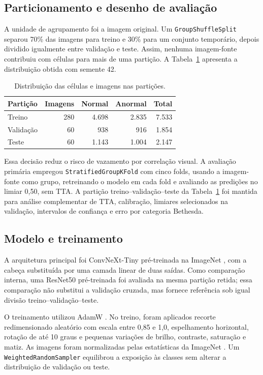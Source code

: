 \subsection{Particionamento e desenho de avaliação}

A unidade de agrupamento foi a imagem original. Um \texttt{GroupShuffleSplit}
separou 70\% das imagens para treino e 30\% para um conjunto temporário, depois
dividido igualmente entre validação e teste. Assim, nenhuma imagem-fonte
contribuiu com células para mais de uma partição. A Tabela~\ref{tab:particoes}
apresenta a distribuição obtida com semente 42.

\begin{table}[ht]
\centering
\caption{Distribuição das células e imagens nas partições.}
\label{tab:particoes}
\begin{tabular}{lrrrr}
\toprule
Partição & Imagens & Normal & Anormal & Total \\
\midrule
Treino & 280 & 4.698 & 2.835 & 7.533 \\
Validação & 60 & 938 & 916 & 1.854 \\
Teste & 60 & 1.143 & 1.004 & 2.147 \\
\bottomrule
\end{tabular}
\end{table}

Essa decisão reduz o risco de vazamento por correlação visual. A avaliação
primária empregou \texttt{StratifiedGroupKFold} com cinco folds, usando a
imagem-fonte como grupo, retreinando o modelo em cada fold e avaliando as
predições no limiar 0,50, sem TTA. A partição treino--validação--teste da
Tabela~\ref{tab:particoes} foi mantida para análise complementar de TTA,
calibração, limiares selecionados na validação, intervalos de confiança e erro
por categoria Bethesda.

\subsection{Modelo e treinamento}

A arquitetura principal foi ConvNeXt-Tiny pré-treinada na ImageNet
\cite{liu2022convnext,deng2009imagenet}, com a cabeça substituída por uma
camada linear de duas saídas. Como comparação interna, uma ResNet50
pré-treinada \cite{he2016resnet} foi avaliada na mesma partição retida; essa
comparação não substitui a validação cruzada, mas fornece referência sob igual
divisão treino--validação--teste.

O treinamento utilizou AdamW \cite{loshchilov2019adamw}. No treino, foram
aplicados recorte redimensionado aleatório com escala entre 0,85 e 1,0,
espelhamento horizontal, rotação de até 10 graus e pequenas variações de
brilho, contraste, saturação e matiz. As imagens foram normalizadas pelas
estatísticas da ImageNet \cite{deng2009imagenet}. Um
\texttt{WeightedRandomSampler} equilibrou a exposição às classes sem alterar a
distribuição de validação ou teste.

